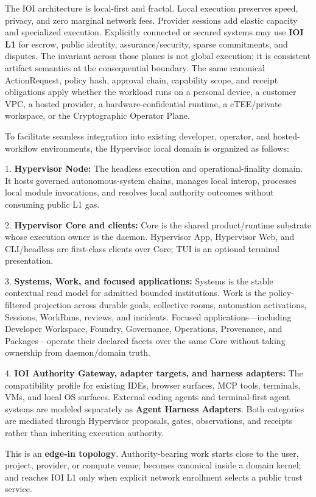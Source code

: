 \documentclass[
  11pt,
]{article}
\begin{document}
The IOI architecture is local-first and fractal. Local execution
preserves speed, privacy, and zero marginal network fees. Provider
sessions add elastic capacity and specialized execution. Explicitly connected
or secured systems may use \textbf{IOI L1} for escrow, public identity,
assurance/security, sparse commitments, and disputes. The
invariant across those planes is not global execution; it is consistent
artifact semantics at the consequential boundary. The same canonical
ActionRequest, policy hash, approval chain, capability scope, and
receipt obligations apply whether the workload runs on a personal
device, a customer VPC, a hosted provider, a hardware-confidential
runtime, a cTEE/private workspace, or the Cryptographic Operator Plane.

To facilitate seamless integration into existing developer, operator,
and hosted-workflow environments, the Hypervisor local domain is
organized as follows:

1. \textbf{Hypervisor Node:} The headless execution and operational-finality
domain. It hosts governed autonomous-system chains, manages local
interop, processes local module invocations, and resolves local
authority outcomes without consuming public L1 gas.

2. \textbf{Hypervisor Core and clients:} Core is the shared
product/runtime substrate whose execution owner is the daemon.
Hypervisor App, Hypervisor Web, and CLI/headless are first-class clients
over Core; TUI is an optional terminal presentation.

3. \textbf{Systems, Work, and focused applications:}
Systems is the stable contextual read model for admitted bounded
institutions. Work is the policy-filtered projection across durable goals,
collective rooms, automation activations, Sessions, WorkRuns, reviews, and
incidents. Focused applications---including Developer Workspace, Foundry,
Governance, Operations, Provenance, and Packages---operate their declared
facets over the same Core without taking ownership from daemon/domain truth.

4. \textbf{IOI Authority Gateway, adapter targets, and harness adapters:}
The compatibility profile for existing IDEs, browser surfaces, MCP tools,
terminals, VMs, and local OS surfaces. External coding agents and
terminal-first agent systems are modeled separately as
\textbf{Agent Harness Adapters}. Both categories are mediated through
Hypervisor proposals, gates, observations, and receipts rather than
inheriting execution authority.

This is an \textbf{edge-in topology}. Authority-bearing work starts
close to the user, project, provider, or compute venue; becomes
canonical inside a domain kernel; and reaches IOI L1 only when explicit
network enrollment selects a public trust service.
\end{document}
